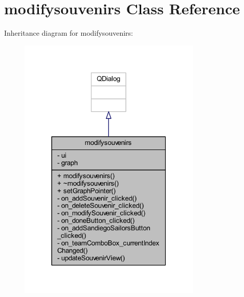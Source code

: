 \hypertarget{classmodifysouvenirs}{}\section{modifysouvenirs Class Reference}
\label{classmodifysouvenirs}


Inheritance diagram for modifysouvenirs\+:
\nopagebreak
\begin{figure}[H]
\begin{center}
\leavevmode
\includegraphics[width=247pt]{classmodifysouvenirs__inherit__graph}
\end{center}
\end{figure}


